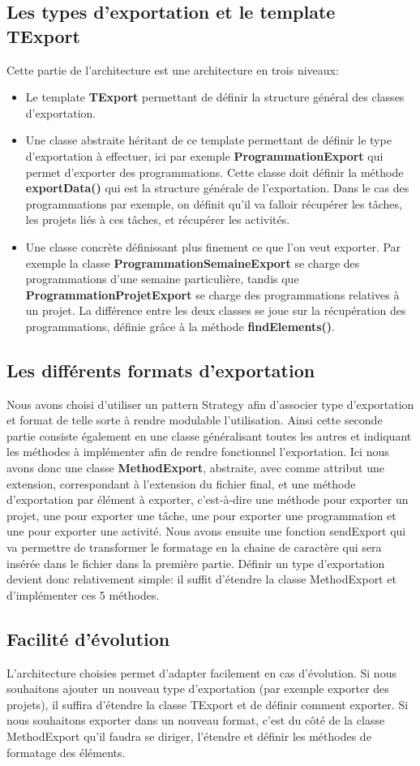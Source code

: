 \subsection{Les types d'exportation et le template TExport}
Cette partie de l'architecture est une architecture en trois niveaux:
\begin{itemize}
	\item Le template \textbf{TExport} permettant de définir la structure général des classes d'exportation.
	\item Une classe abstraite héritant de ce template permettant de définir le type d'exportation à effectuer, ici par exemple \textbf{ProgrammationExport} qui permet d'exporter des programmations. Cette classe doit définir la méthode \textbf{exportData()} qui est la structure générale de l'exportation. Dans le cas des programmations par exemple, on définit qu'il va falloir récupérer les tâches, les projets liés à ces tâches, et récupérer les activités.
	\item Une classe concrète définissant plus finement ce que l'on veut exporter. Par exemple la classe \textbf{ProgrammationSemaineExport} se charge des programmations d'une semaine particulière, tandis que \textbf{ProgrammationProjetExport} se charge des programmations relatives à un projet. La différence entre les deux classes se joue sur la récupération des programmations, définie grâce à la méthode \textbf{findElements()}.
\end{itemize}
\subsection{Les différents formats d'exportation}
Nous avons choisi d'utiliser un pattern Strategy afin d'associer type d'exportation et format de telle sorte à rendre modulable l'utilisation. Ainsi cette seconde partie consiste également en une classe généralisant toutes les autres et indiquant les méthodes à implémenter afin de rendre fonctionnel l'exportation. Ici nous avons donc une classe \textbf{MethodExport}, abstraite, avec comme attribut une extension, correspondant à l'extension du fichier final, et une méthode d'exportation par élément à exporter, c'est-à-dire une méthode pour exporter un projet, une pour exporter une tâche, une pour exporter une programmation et une pour exporter une activité. Nous avons ensuite une fonction sendExport qui va permettre de transformer le formatage en la chaine de caractère qui sera insérée dans le fichier dans la première partie.
Définir un type d'exportation devient donc relativement simple: il suffit d'étendre la classe MethodExport et d'implémenter ces 5 méthodes.
\subsection{Facilité d'évolution}
L'architecture choisies permet d'adapter facilement en cas d'évolution. Si nous souhaitons ajouter un nouveau type d'exportation (par exemple exporter des projets), il suffira d'étendre la classe TExport et de définir comment exporter. Si nous souhaitons exporter dans un nouveau format, c'est du côté de la classe MethodExport qu'il faudra se diriger, l'étendre et définir les méthodes de formatage des éléments.